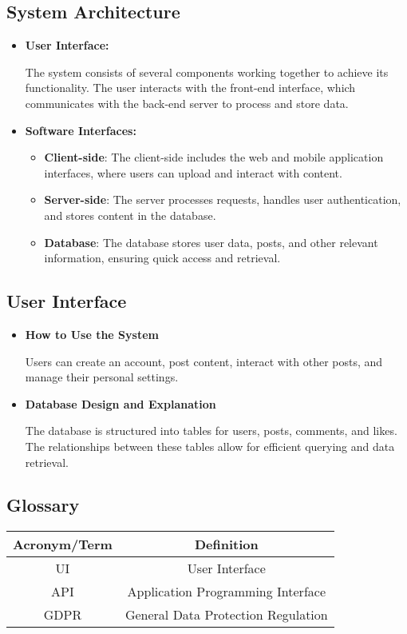 \documentclass{article}
\begin{document}
\subsection{System Architecture}
\begin{itemize}
    \item \textbf{User Interface:}

            The system consists of several components working together to achieve its functionality. The user interacts with the front-end interface, which communicates with the back-end server to process and store data. 

    \item \textbf{Software Interfaces:}
        \begin{itemize}
            \item \textbf{Client-side}: The client-side includes the web and mobile application interfaces, where users can upload and interact with content.
            \item \textbf{Server-side}: The server processes requests, handles user authentication, and stores content in the database.
            \item \textbf{Database}: The database stores user data, posts, and other relevant information, ensuring quick access and retrieval.
        \end{itemize}

\end{itemize}

\subsection{User Interface}
\begin{itemize}
    \item \textbf{How to Use the System}
        
            Users can create an account, post content, interact with other posts, and manage their personal settings.
        
    \item \textbf{Database Design and Explanation}
        
            The database is structured into tables for users, posts, comments, and likes. The relationships between these tables allow for efficient querying and data retrieval.
        
\end{itemize}

\subsection{Glossary}
\begin{tabular}{|c|c|}
    \hline
    \textbf{Acronym/Term} & \textbf{Definition} \\
    \hline
    UI & User Interface \\
    API & Application Programming Interface \\
    GDPR & General Data Protection Regulation \\
    \hline
\end{tabular}
\end{document}
